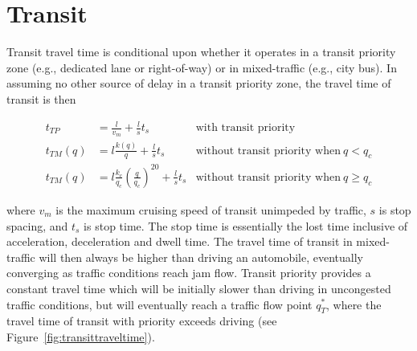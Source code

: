 \documentclass{article}
\begin{document}
\section{Transit}

Transit travel time is conditional upon whether it operates in a transit priority zone (e.g., dedicated lane or right-of-way) or in mixed-traffic (e.g., city bus). In assuming no other source of delay in a transit priority zone, the travel time of transit is then

\begin{subequations}
\begin{align}
    t_{TP} & = \frac{l}{v_{m}} + \frac{l}{s}t_s  & \text{with transit priority} \\
    t_{TM}(q) & = l\frac{k(q)}{q} + \frac{l}{s}t_s  & \text{without transit priority when}~q < q_c\\
    t_{TM}(q) & = l\frac{k_c}{q_c} \left(\frac{q}{q_c}\right)^{20} + \frac{l}{s}t_s & \text{without transit priority when}~q \geq q_c
\end{align}
\end{subequations}

\noindent where $v_m$ is the maximum cruising speed of transit unimpeded by traffic, $s$ is stop spacing, and $t_s$ is stop time. The stop time is essentially the lost time inclusive of acceleration, deceleration and dwell time. The travel time of transit in mixed-traffic will then always be higher than driving an automobile, eventually converging as traffic conditions reach jam flow. Transit priority provides a constant travel time which will be initially slower than driving in uncongested traffic conditions, but will eventually reach a traffic flow point $q^*_T$, where the travel time of transit with priority exceeds driving (see Figure~\ref{fig:transittraveltime}).
\end{document}

